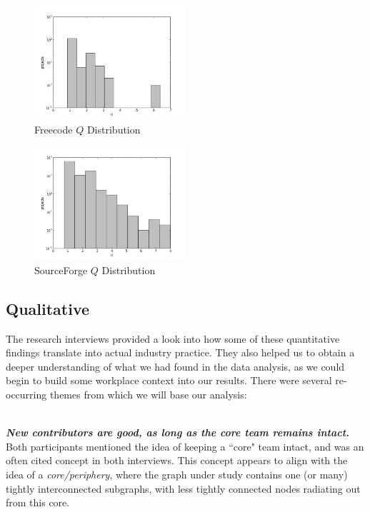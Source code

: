 \documentclass{proc}
\begin{document}
\begin{figure}
\begin{center}
\includegraphics[width=0.5\textwidth]{images/freecode-q-histo.png}
\end{center}
\caption{Freecode $Q$ Distribution}
\label{fig:q_fc_distribution}
\end{figure}

\begin{figure}
\begin{center}
\includegraphics[width=0.5\textwidth]{images/sf-q-histo.png}
\end{center}
\caption{SourceForge $Q$ Distribution}
\label{fig:q_sf_distribution}
\end{figure}

\subsection{Qualitative}
The research interviews provided a look into how some of these quantitative findings translate into actual industry practice. They also helped us to obtain a deeper understanding of what we had found in the data analysis, as we could begin to build some workplace context into our results. There were several re-occurring themes from which we will base our analysis\cite{stmartin_interview,rana_interview}:

\noindent\\\textit{\textbf{New contributors are good, as long as the core team remains intact.}}\\
Both participants mentioned the idea of keeping a ``core" team intact, and was an often cited concept in both interviews. This concept appears to align with the idea of a \textit{core/periphery}\cite{borgatti2000models}, where the graph under study contains one (or many) tightly interconnected subgraphs, with less tightly connected nodes radiating out from this core.
\end{document}
